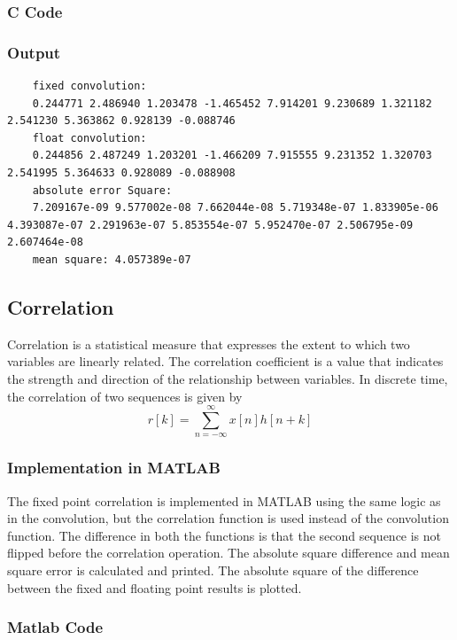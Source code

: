 \documentclass[a4paper,12pt]{article}
\begin{document}
\subsubsection{C Code}


\subsubsection{Output}
\begin{lstlisting}
    fixed convolution:
    0.244771 2.486940 1.203478 -1.465452 7.914201 9.230689 1.321182 2.541230 5.363862 0.928139 -0.088746 
    float convolution:
    0.244856 2.487249 1.203201 -1.466209 7.915555 9.231352 1.320703 2.541995 5.364633 0.928089 -0.088908 
    absolute error Square:
    7.209167e-09 9.577002e-08 7.662044e-08 5.719348e-07 1.833905e-06 4.393087e-07 2.291963e-07 5.853554e-07 5.952470e-07 2.506795e-09 2.607464e-08 
    mean square: 4.057389e-07
\end{lstlisting}

\subsection{Correlation}
Correlation is a statistical measure that expresses the extent to which two variables are linearly related.
The correlation coefficient is a value that indicates the strength and direction of the relationship between variables.
In discrete time, the correlation of two sequences is given by
\[
    r[k] = \sum_{n=-\infty}^{\infty} x[n]h[n+k]
\]

\subsubsection{Implementation in MATLAB}
The fixed point correlation is implemented in MATLAB using the same logic as in the convolution,
but the correlation function is used instead of the convolution function. The 
difference in both the functions is that the second sequence is not flipped before the correlation operation.
The absolute square difference and mean square error is calculated and printed.
The absolute square of the difference between the fixed and floating point results is plotted.


\subsubsection{Matlab Code}

\end{document}
